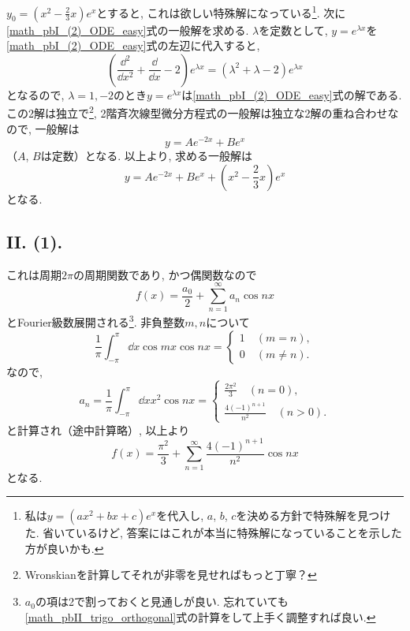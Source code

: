 $y_0=(x^2-\frac{2}{3}x)e^x$とすると, これは欲しい特殊解になっている\footnote{私は$y=(ax^2+bx+c)e^{x}$を代入し, $a$, $b$, $c$を決める方針で特殊解を見つけた. 省いているけど, 答案にはこれが本当に特殊解になっていることを示した方が良いかも. }. 
次に\eqref{math_pbI_(2)_ODE_easy}式の一般解を求める. 
$\lambda$を定数として, $y=e^{\lambda x}$を\eqref{math_pbI_(2)_ODE_easy}式の左辺に代入すると, 
\begin{equation}
  \left(\frac{\dd^2}{\dd x^2}+\frac{\dd}{\dd x}-2\right)e^{\lambda x}=(\lambda^2+\lambda-2)e^{\lambda x}
\end{equation}
となるので, $\lambda=1, -2$のとき$y=e^{\lambda x}$は\eqref{math_pbI_(2)_ODE_easy}式の解である. 
この2解は独立で\footnote{Wronskianを計算してそれが非零を見せればもっと丁寧？}, 2階斉次線型微分方程式の一般解は独立な2解の重ね合わせなので, 一般解は
\begin{equation}
  y=Ae^{-2x}+Be^{x}
\end{equation}
（$A$, $B$は定数）となる. 
以上より, 求める一般解は
\begin{equation}
  y=Ae^{-2x}+Be^{x}+\left(x^2-\frac{2}{3}x\right)e^x
\end{equation}
となる. 

\subsection*{II. (1).}
これは周期$2\pi$の周期関数であり, かつ偶関数なので
\begin{equation}
  f(x)=\frac{a_0}{2}+\sum_{n=1}^{\infty}a_n\cos{nx}
\end{equation}
とFourier級数展開される\footnote{$a_0$の項は2で割っておくと見通しが良い. 忘れていても\eqref{math_pbII_trigo_orthogonal}式の計算をして上手く調整すれば良い. }. 
非負整数$m, n$について
\begin{equation}
  \frac{1}{\pi}\int_{-\pi}^{\pi}\dd{x}\cos{mx}\cos{nx}=
  \begin{cases}
    1\quad (m=n), \\
    0\quad (m\neq n). 
  \end{cases}\label{math_pbII_trigo_orthogonal}
\end{equation}
なので, 
\begin{equation}
  a_n=\frac{1}{\pi}\int_{-\pi}^{\pi}\dd{x}x^2\cos{nx}=  \begin{cases}
    \frac{2\pi^2}{3}\quad (n=0), \\
    \frac{4(-1)^{n+1}}{n^2}\quad (n>0). 
  \end{cases}
\end{equation}
と計算され（途中計算略）, 以上より
\begin{equation}
  f(x)=\frac{\pi^2}{3}+\sum_{n=1}^{\infty}\frac{4(-1)^{n+1}}{n^2}\cos{nx}
\end{equation}
となる. 

